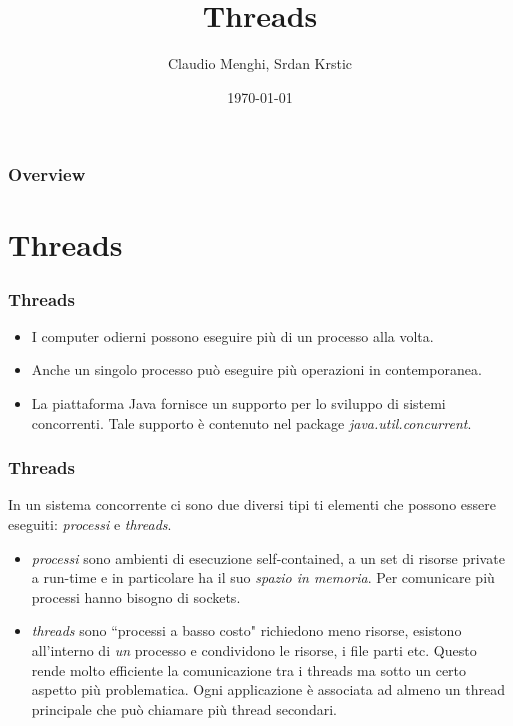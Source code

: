 \documentclass{beamer}
\title[Introduzione]{Threads} %
\author{Claudio Menghi,  Srdan Krstic} %
\institute[Deepse group] %
{
Politecnico di Milano \\ %
\medskip
\textit{menghi@elet.polimi.it,  srdan.krstic@polimi.it} %
}
\date{\today} %
\begin{document}
\begin{frame}
\titlepage %
\end{frame}

\begin{frame}
\frametitle{Overview} %
\tableofcontents %
\end{frame}




\section{Threads}
\begin{frame}
\frametitle{Threads}
\begin{itemize}
\item I computer odierni possono eseguire pi\`u di un processo alla volta. 
\item Anche un singolo processo pu\`o eseguire pi\`u operazioni in contemporanea. 
\item La piattaforma Java fornisce un supporto per lo sviluppo di sistemi concorrenti. Tale supporto \`e contenuto nel package \emph{java.util.concurrent}.
\end{itemize}
\end{frame}

\begin{frame}
\frametitle{Threads}
In un sistema concorrente ci sono due diversi tipi ti elementi che possono essere eseguiti: \emph{processi} e \emph{threads}. 
\begin{itemize}
\item \emph{processi} sono ambienti di esecuzione self-contained, a un set di risorse private a run-time e in particolare ha il suo \emph{spazio in memoria}. Per comunicare pi\`u processi hanno bisogno di sockets.
\item \emph{threads} sono ``processi a basso costo" richiedono meno risorse, esistono all'interno di \emph{un} processo e condividono le risorse, i file parti etc. Questo rende molto efficiente la comunicazione tra i threads ma sotto un certo aspetto pi\`u problematica. Ogni applicazione \`e associata ad almeno un thread principale che pu\`o chiamare pi\`u thread secondari.
\end{itemize}
\end{frame}
\end{document}
